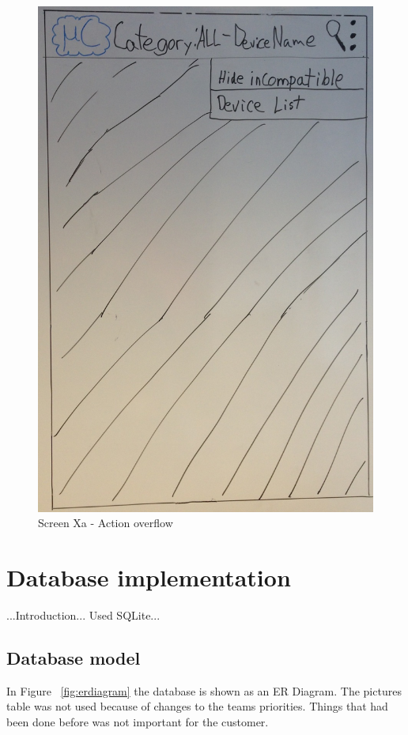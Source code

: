 \begin{figure}[H]
\centering
\includegraphics[scale=0.2]{images/Design_guide/ScreenXa.png}
\caption{Screen Xa - Action overflow}
\end{figure}

\section{Database implementation}

	...Introduction...
	Used SQLite...

	\subsection{Database model}

		In Figure ~\ref{fig:erdiagram} the database is shown as an ER Diagram. The pictures table was not used because of changes to the teams priorities. Things that had been done before was not important for the customer.

